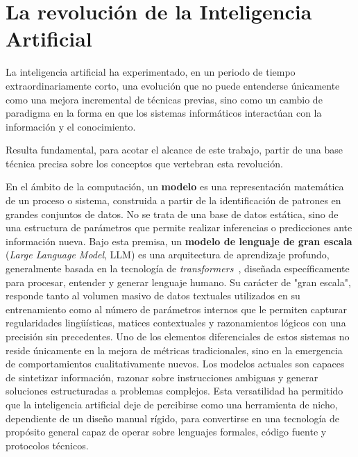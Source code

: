 \section{La revolución de la Inteligencia Artificial}
La inteligencia artificial ha experimentado, en un periodo de tiempo extraordinariamente corto, una evolución que no puede entenderse únicamente como una mejora incremental de técnicas previas, sino como un cambio de paradigma en la forma en que los sistemas informáticos interactúan con la información y el conocimiento. 

Resulta fundamental, para acotar el alcance de este trabajo, partir de una base técnica precisa sobre los conceptos que vertebran esta revolución. 

En el ámbito de la computación, un \textbf{modelo} es una representación matemática de un proceso o sistema, construida a partir de la identificación de patrones en grandes conjuntos de datos. No se trata de una base de datos estática, sino de una estructura de parámetros que permite realizar inferencias o predicciones ante información nueva. Bajo esta premisa, un \textbf{modelo de lenguaje de gran escala} (\textit{Large Language Model}, LLM) es una arquitectura de aprendizaje profundo, generalmente basada en la tecnología de \textit{transformers}~\cite{trasnformers}, diseñada específicamente para procesar, entender y generar lenguaje humano. Su carácter de "gran escala", responde tanto al volumen masivo de datos textuales utilizados en su entrenamiento como al número de parámetros internos que le permiten capturar regularidades lingüísticas, matices contextuales y razonamientos lógicos con una precisión sin precedentes.
Uno de los elementos diferenciales de estos sistemas no reside únicamente en la mejora de métricas tradicionales, sino en la emergencia de comportamientos cualitativamente nuevos. \cite{huang2023reasoning} Los modelos actuales son capaces de sintetizar información, razonar sobre instrucciones ambiguas y generar soluciones estructuradas a problemas complejos. Esta versatilidad ha permitido que la inteligencia artificial deje de percibirse como una herramienta de nicho, dependiente de un diseño manual rígido, para convertirse en una tecnología de propósito general \cite{bresnahan1995gpt, brynjolfsson2023gpt_ai} capaz de operar sobre lenguajes formales, código fuente y protocolos técnicos. \cite{chen2021humaneval}

